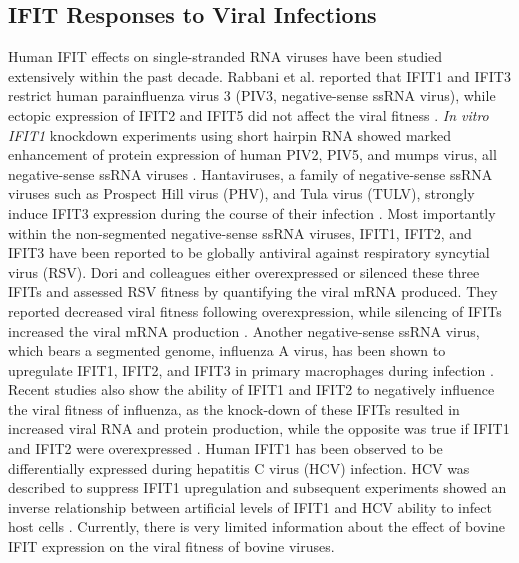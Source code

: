 \subsection{IFIT Responses to Viral Infections} \label{subsec:IFIT Responses to Viral Infections}
Human IFIT effects on single-stranded RNA viruses have been studied extensively within the past decade. Rabbani et al. reported that IFIT1 and IFIT3 restrict human parainfluenza virus 3 (PIV3, negative-sense ssRNA virus), while ectopic expression of IFIT2 and IFIT5 did not affect the viral fitness \cite{Rabbani2016Identification3}. \textit{In vitro} \textit{IFIT1} knockdown experiments using short hairpin RNA showed marked enhancement of protein expression of human PIV2, PIV5, and mumps virus, all negative-sense ssRNA viruses \cite{Andrejeva2013ISG56/IFIT1Synthesis, Young2016HumanFamily}. Hantaviruses, a family of negative-sense ssRNA viruses such as Prospect Hill virus (PHV), and Tula virus (TULV), strongly induce IFIT3 expression during the course of their infection \cite{Matthys2011TheInduction}. Most importantly within the non-segmented negative-sense ssRNA viruses, IFIT1, IFIT2, and IFIT3 have been reported to be globally antiviral against respiratory syncytial virus (RSV). Dori and colleagues either overexpressed or silenced these three IFITs and assessed RSV fitness by quantifying the viral mRNA produced. They reported decreased viral fitness following overexpression, while silencing of IFITs increased the viral mRNA production \cite{Drori2020InfluenzaProteins}. Another negative-sense ssRNA virus, which bears a segmented genome, influenza A virus, has been shown to upregulate IFIT1, IFIT2, and IFIT3 in primary macrophages during infection \cite{Lietzen2011QuantitativeMacrophages}. Recent studies also show the ability of IFIT1 and IFIT2 to negatively influence the viral fitness of influenza, as the knock-down of these IFITs resulted in increased viral RNA and protein production, while the opposite was true if IFIT1 and IFIT2 were overexpressed \cite{Zhu2023TheSynthesis}. Human IFIT1 has been observed to be differentially expressed during hepatitis C virus (HCV) infection. HCV was described to suppress IFIT1 upregulation and subsequent experiments showed an inverse relationship between artificial levels of IFIT1 and HCV ability to infect host cells \cite{Raychoudhuri2011ISG56Replication, Ishida2019HepaticInfection}. Currently, there is very limited information about the effect of bovine IFIT expression on the viral fitness of bovine viruses.



